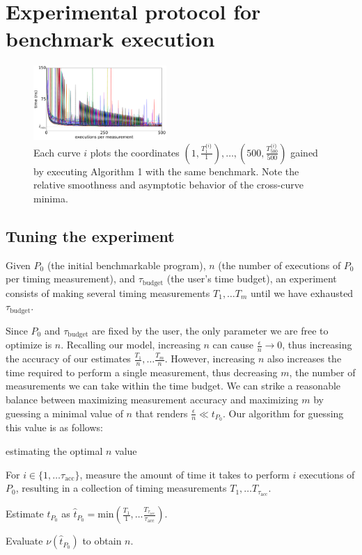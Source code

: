 \documentclass[conference]{IEEEtran}
\begin{document}
\label{sec:protocol}
\section{Experimental protocol for benchmark execution}

\begin{figure}
\centering
\includegraphics[width=0.45\textwidth]{figures/fig2/linear_scan_branchsum}
\caption{Each curve $i$ plots the coordinates
$\left(1, \frac{T^{\{i\}}_1}{1}\right), \dots,
\left(500, \frac{T^{\{i\}}_{500}}{500}\right)$
gained by executing Algorithm 1 with the same benchmark. Note the relative
smoothness and asymptotic behavior of the cross-curve minima.}
\label{fig:scaling}
\end{figure}

\subsection{Tuning the experiment}

Given $P_0$ (the initial benchmarkable program), $n$ (the number of executions of $P_0$ per
timing measurement), and $\tau_{\textrm{budget}}$ (the user's time budget), an experiment
consists of making several timing measurements $T_1, \dots T_m$ until we have exhausted
$\tau_{\textrm{budget}}$.

Since $P_0$ and $\tau_{\textrm{budget}}$ are fixed by the user, the only parameter we are
free to optimize is $n$. Recalling our model, increasing $n$ can cause $\frac{\epsilon}{n}
\to 0$, thus increasing the accuracy of our estimates $\frac{T_1}{n}, \dots \frac{T_m}{n}$.
However, increasing $n$ also increases the time required to perform a single measurement,
thus decreasing $m$, the number of measurements we can take within the time budget. We can
strike a reasonable balance between maximizing measurement accuracy and maximizing $m$ by
guessing a minimal value of $n$ that renders $\frac{\epsilon}{n} \ll t_{P_0}$. Our
algorithm for guessing this value is as follows:

\begin{algorithm}
    \caption{estimating the optimal $n$ value}
    For $i \in \{1, \dots \tau_{\textrm{acc}}\}$, measure the amount of time it takes
    to perform $i$ executions of $P_0$, resulting in a collection of timing measurements
    $T_1, \dots T_{\tau_{\textrm{acc}}}$.

    Estimate $t_{P_0}$ as $\hat{t}_{P_0} = \textrm{min}(\frac{T_1}{1}, \dots \frac{T_{\tau_{\textrm{acc}}}}{\tau_{\textrm{acc}}})$.

    Evaluate $\nu(\hat{t}_{P_0})$ to obtain $n$.
\end{algorithm}
\end{document}
